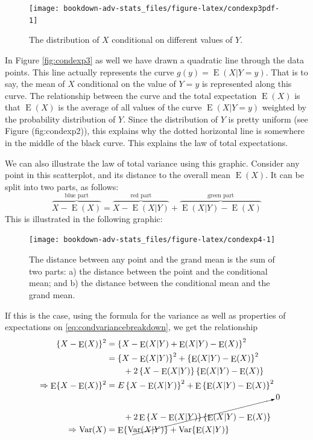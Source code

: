 \documentclass[
]{book}
\DeclareMathOperator{\E}{E}
\DeclareMathOperator{\Var}{Var}
\theoremstyle{definition}
\theoremstyle{definition}
\theoremstyle{definition}
\theoremstyle{definition}
\theoremstyle{remark}
\begin{document}
\begin{figure}

{\centering \texttt{[image: bookdown-adv-stats\_files/figure-latex/condexp3pdf-1]} 

}

\caption{The distribution of \(X\) conditional on different values of \(Y\).}\label{fig:condexp3pdf}
\end{figure}

In Figure \ref{fig:condexp3} as well we have drawn a quadratic line through the data points.
This line actually represents the curve \(g(y)=\E(X|Y=y)\).
That is to say, the mean of \(X\) conditional on the value of \(Y=y\) is represented along this curve.
The relationship between the curve and the total expectation \(\E(X)\) is that \(\E(X)\) is the average of all values of the curve \(\E(X|Y=y)\) weighted by the probability distribution of \(Y\).
Since the distribution of \(Y\) is pretty uniform (see Figure (fig:condexp2)), this explains why the dotted horizontal line is somewhere in the middle of the black curve.
This explains the law of total expectations.

We can also illustrate the law of total variance using this graphic.
Consider any point in this scatterplot, and its distance to the overall mean \(\E(X)\).
It can be split into two parts, as follows:
\begin{equation}
\overbrace{X - \E(X)}^{\text{blue part}} = \overbrace{X - \E(X|Y)}^{\text{red part}} + \overbrace{\E(X|Y) - \E(X)}^{\text{green part}} \label{eq:condvariancebreakdown}
\end{equation}
This is illustrated in the following graphic:

\begin{figure}

{\centering \texttt{[image: bookdown-adv-stats\_files/figure-latex/condexp4-1]} 

}

\caption{The distance between any point and the grand mean is the sum of two parts: a) the distance between the point and the conditional mean; and b) the distance between the conditional mean and the grand mean.}\label{fig:condexp4}
\end{figure}

If this is the case, using the formula for the variance as well as properties of expectations on \eqref{eq:condvariancebreakdown}, we get the relationship
\begin{align*}
\{X - \E(X)\}^2 &= \left\{X - \E(X|Y) + \E(X|Y) - \E(X) \right\}^2 \\
&= \left\{X - \E(X|Y)\right\}^2 + \left\{\E(X|Y) - \E(X) \right\}^2 \\
&\hspace{2em}+ 2 \left\{X - \E(X|Y)\right\} \left\{\E(X|Y) - \E(X) \right\} \\
\Rightarrow \E\{X - \E(X)\}^2
&= E\left\{X - \E(X|Y)\right\}^2 + \E\left\{\E(X|Y) - \E(X) \right\}^2 \\
&\hspace{2em}+ \cancelto{0}{2 \E \left\{X - \E(X|Y)\right\} \left\{\E(X|Y) - \E(X) \right\}} \\
\Rightarrow \Var(X) &= \E\{\Var(X|Y) \} + \Var\{\E(X|Y)\}
\end{align*}
\end{document}
